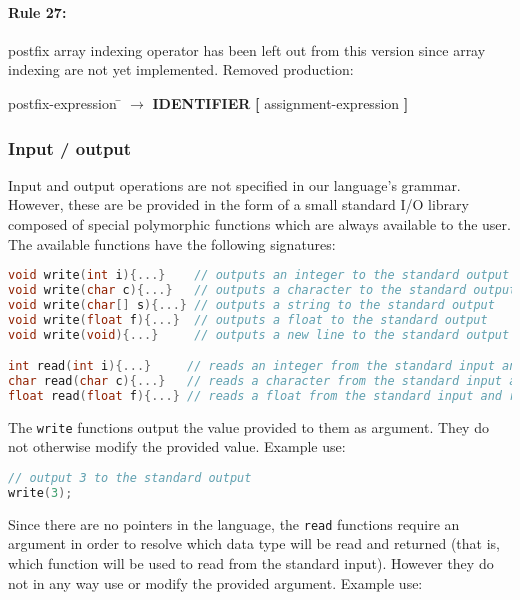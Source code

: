 \paragraph{Rule 27:} postfix array indexing operator has been left out from this version since
array indexing are not yet implemented. Removed production:

\begin{tabbing} postfix-expression \= $\rightarrow$ \= \textbf{IDENTIFIER} \textbf{[} assignment-expression \textbf{]} \end{tabbing}

\subsubsection{Input / output}
Input and output operations are not specified in our language's grammar. However, these are be provided
in the form of a small standard I/O library composed of special polymorphic functions which are always
available to the user. The available functions have the following signatures:

\begin{lstlisting}[language=C]
void write(int i){...}    // outputs an integer to the standard output
void write(char c){...}   // outputs a character to the standard output
void write(char[] s){...} // outputs a string to the standard output
void write(float f){...}  // outputs a float to the standard output
void write(void){...}     // outputs a new line to the standard output

int read(int i){...}     // reads an integer from the standard input and returns it
char read(char c){...}   // reads a character from the standard input and returns it
float read(float f){...} // reads a float from the standard input and returns it
\end{lstlisting}

The \texttt{write} functions output the value provided to them as argument. They do not
otherwise modify the provided value. Example use:

\begin{lstlisting}[language=C]
// output 3 to the standard output
write(3);
\end{lstlisting}

Since there are no pointers in the language, the \texttt{read} functions require an argument
in order to resolve which data type will be read and returned (that is, which function
will be used to read from the standard input). However they do not in any way use or modify the
provided argument. Example use:


